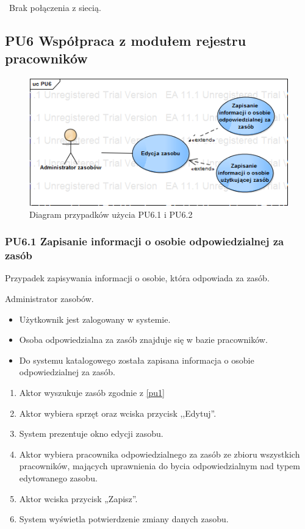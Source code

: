\
Brak połączenia z siecią.


\subsection{PU6 Współpraca z modułem rejestru pracowników} \label{pu6}
\begin{figure}[h!]
	\centering
	\includegraphics[scale=0.6]{img/diagrams/useCaseDiagrams/PU6.png}
	\caption{Diagram przypadków użycia PU6.1 i PU6.2 \label{fig:labelUCPU6}}
\end{figure}

\subsubsection{PU6.1 Zapisanie informacji o osobie odpowiedzialnej za zasób}
\myparagraph{Opis}
Przypadek zapisywania informacji o osobie, która odpowiada za zasób.

Administrator zasobów.

\begin{itemize}
\item Użytkownik jest zalogowany w systemie.
\item Osoba odpowiedzialna za zasób znajduje się w bazie pracowników.
\end{itemize}

\begin{itemize}
\item Do systemu katalogowego została zapisana informacja o osobie odpowiedzialnej za zasób.
\end{itemize}

\begin{enumerate}
	\item \label{pu6.1:1} Aktor wyszukuje zasób zgodnie z \ref{pu1}
	\item \label{pu6.1:2} Aktor wybiera sprzęt oraz wciska przycisk ,,Edytuj''.
	\item System prezentuje okno edycji zasobu.
	\item Aktor wybiera pracownika odpowiedzialnego za zasób ze zbioru wszystkich pracowników, mających uprawnienia do bycia odpowiedzialnym nad typem edytowanego zasobu.
	\item Aktor wciska przycisk „Zapisz”.
	\item System wyświetla potwierdzenie zmiany danych zasobu.
\end{enumerate}

